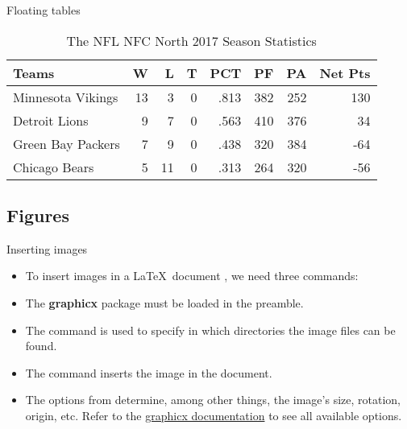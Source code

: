 \begin{frame}[fragile]{Floating tables}
\begin{onlyenv}
		\begin{table}
			\begin{tabularx}{\textwidth}{X|rrr|r|rrr}
				Teams				&	W	&	L	&	T	&	PCT		&	PF	&	PA	&	Net Pts \\
				\hline
				Minnesota Vikings	&	13	&	3	&	0	&	.813	&	382	&	252	&	130 \\
				Detroit Lions		&	9	&	7	&	0	&	.563	&	410	&	376	&	34 \\
				Green Bay Packers	&	7	&	9	& 	0	&	.438	&	320	&	384	&	-64 \\
				Chicago Bears		&	5	&	11	&	0	&	.313	&	264	&	320	&	-56
			\end{tabularx}
			\caption{The NFL NFC North 2017 Season Statistics}
		\end{table}
	\end{onlyenv}
\end{frame}

\subsection{Figures}

\begin{frame}[fragile,c]{Inserting images}
	\begin{itemize}
		\item To insert images in a \LaTeX\ document , we need three commands:

		\pause
		\item The \textbf{graphicx} package must be loaded in the preamble.
		\item The  command is used to specify in which directories the image files can be found.
		\item The  command inserts the image in the document.
		\item The options from  determine, among other things, the image's size, rotation, origin, etc. Refer to the  \href{http://mirrors.ctan.org/macros/latex/required/graphics/grfguide.pdf}{graphicx documentation} to see all available options.
	\end{itemize}
\end{frame}

